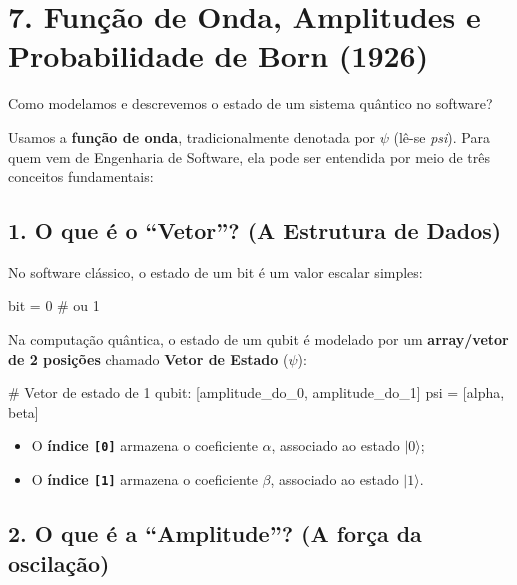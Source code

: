\documentclass[
  brazilian,
]{report}
\newenvironment{Shaded}{\begin{snugshade}}{\end{snugshade}}
\newcommand{\CommentTok}[1]{\textcolor[rgb]{0.37,0.37,0.37}{#1}}
\newcommand{\DecValTok}[1]{\textcolor[rgb]{0.68,0.00,0.00}{#1}}
\newcommand{\NormalTok}[1]{\textcolor[rgb]{0.00,0.23,0.31}{#1}}
\newcommand{\OperatorTok}[1]{\textcolor[rgb]{0.37,0.37,0.37}{#1}}
\providecommand{\tightlist}{%
  \setlength{\itemsep}{0pt}\setlength{\parskip}{0pt}}
\begin{document}
\section{7. Função de Onda, Amplitudes e Probabilidade de Born
(1926)}\label{funuxe7uxe3o-de-onda-amplitudes-e-probabilidade-de-born-1926}

Como modelamos e descrevemos o estado de um sistema quântico no
software?

Usamos a \textbf{função de onda}, tradicionalmente denotada por \(\psi\)
(lê-se \emph{psi}). Para quem vem de Engenharia de Software, ela pode
ser entendida por meio de três conceitos fundamentais:

\subsection{1. O que é o ``Vetor''? (A Estrutura de
Dados)}\label{o-que-uxe9-o-vetor-a-estrutura-de-dados}

No software clássico, o estado de um bit é um valor escalar simples:

\begin{Shaded}
\begin{Highlighting}[]
\NormalTok{bit }\OperatorTok{=} \DecValTok{0}  \CommentTok{\# ou 1}
\end{Highlighting}
\end{Shaded}

Na computação quântica, o estado de um qubit é modelado por um
\textbf{array/vetor de 2 posições} chamado \textbf{Vetor de Estado}
(\(\psi\)):

\begin{Shaded}
\begin{Highlighting}[]
\CommentTok{\# Vetor de estado de 1 qubit: [amplitude\_do\_0, amplitude\_do\_1]}
\NormalTok{psi }\OperatorTok{=}\NormalTok{ [alpha, beta]}
\end{Highlighting}
\end{Shaded}

\begin{itemize}
\tightlist
\item
  O \textbf{índice \texttt{{[}0{]}}} armazena o coeficiente \(\alpha\),
  associado ao estado \(|0\rangle\);
\item
  O \textbf{índice \texttt{{[}1{]}}} armazena o coeficiente \(\beta\),
  associado ao estado \(|1\rangle\).
\end{itemize}

\subsection{2. O que é a ``Amplitude''? (A força da
oscilação)}\label{o-que-uxe9-a-amplitude-a-foruxe7a-da-oscilauxe7uxe3o}
\end{document}
